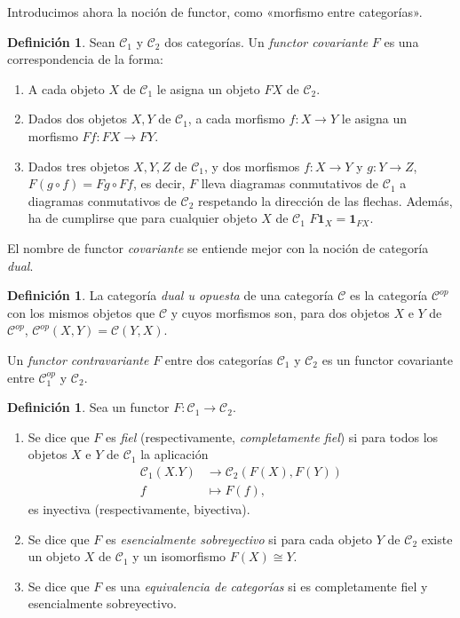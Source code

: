 \documentclass[12pt,a4paper]{article}
\theoremstyle{definition} \newtheorem{defn}[thm]{Definición}
\theoremstyle{definition} \newtheorem{ejemplo}[thm]{Ejemplo}
\theoremstyle{definition} \newtheorem{ejercicio}[thm]{Ejercicio}
\theoremstyle{remark} \newtheorem*{obs}{Observación}
\def\CC{\mathscr{C}}
\def\cat{\mathscr{C}}
\def\id{\mathbf{1}}
\begin{document}
Introducimos ahora la noción de functor, como «morfismo entre categorías».
\begin{defn}
  Sean $\cat_1$ y $\cat_2$ dos categorías. Un \emph{functor covariante} $F$ es una correspondencia de la forma:
  \begin{enumerate}
    \item A cada objeto $X$ de $\cat_1$ le asigna un objeto $FX$ de $\cat_2$.
    \item Dados dos objetos $X,Y$ de $\cat_1$, a cada morfismo $f:X\rightarrow Y$ le asigna un morfismo $Ff:FX\rightarrow FY$.
    \item Dados tres objetos $X,Y,Z$ de $\cat_1$, y dos morfismos $f:X\rightarrow Y$ y $g:Y\rightarrow Z$, $F(g\circ f)=Fg \circ Ff$, es decir, $F$ lleva diagramas conmutativos de $\cat_1$ a diagramas conmutativos de $\cat_2$ respetando la dirección de las flechas. Además, ha de cumplirse que para cualquier objeto $X$ de $\cat_1$ $F\id_X=\id_{FX}$.
  \end{enumerate}
\end{defn}

El nombre de functor \emph{covariante} se entiende mejor con la noción de categoría \emph{dual}.

\begin{defn}
  La categoría \emph{dual u opuesta} de una categoría $\CC$ es la categoría $\CC^{op}$ con los mismos objetos que $\CC$ y cuyos morfismos son, para dos objetos $X$ e $Y$ de $\CC^{op}$, $\CC^{op}(X,Y)=\CC(Y,X)$.

  Un \emph{functor contravariante} $F$ entre dos categorías $\CC_1$ y $\CC_2$ es un functor covariante entre $\CC_1^{op}$ y $\CC_2$.
\end{defn}

\begin{defn}
  Sea un functor $F:\CC_1 \rightarrow \CC_2$. 
  \begin{enumerate}
\item Se dice que $F$ es \emph{fiel} (respectivamente, \emph{completamente fiel}) si para todos los objetos $X$ e $Y$ de $\CC_1$ la aplicación 
  \begin{align*}
     \CC_1(X.Y)&\longrightarrow \CC_2(F(X),F(Y))\\ 
      f &\longmapsto F(f),
    \end{align*}
    es inyectiva (respectivamente, biyectiva). 

  \item Se dice que $F$ es \emph{esencialmente sobreyectivo} si para cada objeto $Y$ de $\CC_2$ existe un objeto $X$ de $\CC_1$ y un isomorfismo $F(X)\cong Y$.

  \item Se dice que $F$ es una \emph{equivalencia de categorías} si es completamente fiel y esencialmente sobreyectivo.
\end{enumerate}
\end{defn}
\end{document}
